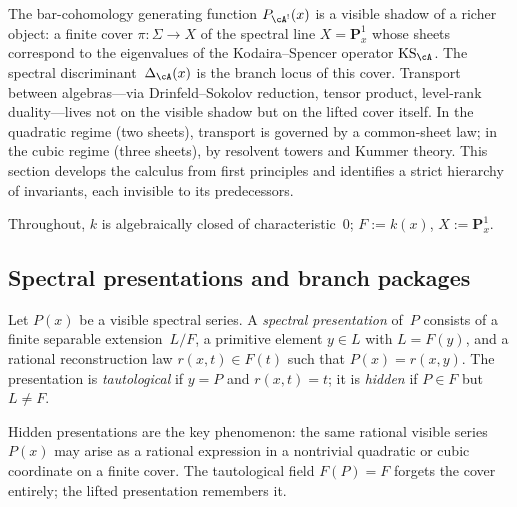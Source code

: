 The bar-cohomology generating function $P_{\cA^!}(x)$ is a visible
shadow of a richer object: a finite cover $\pi \colon \Sigma \to X$
of the spectral line $X = \mathbf{P}^1_x$ whose sheets correspond to
the eigenvalues of the Kodaira--Spencer operator
$\mathrm{KS}_\cA$.  The spectral discriminant~$\Delta_\cA(x)$
is the branch locus of this cover.  Transport between algebras---via
Drinfeld--Sokolov reduction, tensor product, level-rank duality---lives
not on the visible shadow but on the lifted cover itself.  In the
quadratic regime (two sheets), transport is governed by a common-sheet
law; in the cubic regime (three sheets), by resolvent towers and
Kummer theory.  This section develops the calculus from first
principles and identifies a strict hierarchy of invariants, each
invisible to its predecessors.

Throughout, $k$ is algebraically closed of characteristic~$0$;
$F := k(x)$, $X := \mathbf{P}^1_x$.

\subsection{Spectral presentations and branch packages}
\label{subsec:spectral-presentations}

\begin{definition}
\label{def:spectral-presentation}
Let $P(x)$ be a visible spectral series.  A \emph{spectral
presentation} of~$P$ consists of a finite separable extension~$L/F$,
a primitive element $y \in L$ with $L = F(y)$, and a rational
reconstruction law $r(x,t) \in F(t)$ such that $P(x) = r(x,y)$.
The presentation is \emph{tautological} if $y = P$ and $r(x,t) = t$;
it is \emph{hidden} if $P \in F$ but $L \neq F$.
\end{definition}

Hidden presentations are the key phenomenon: the same rational visible
series~$P(x)$ may arise as a rational expression in a nontrivial
quadratic or cubic coordinate on a finite cover.  The tautological
field $F(P) = F$ forgets the cover entirely; the lifted presentation
remembers it.

